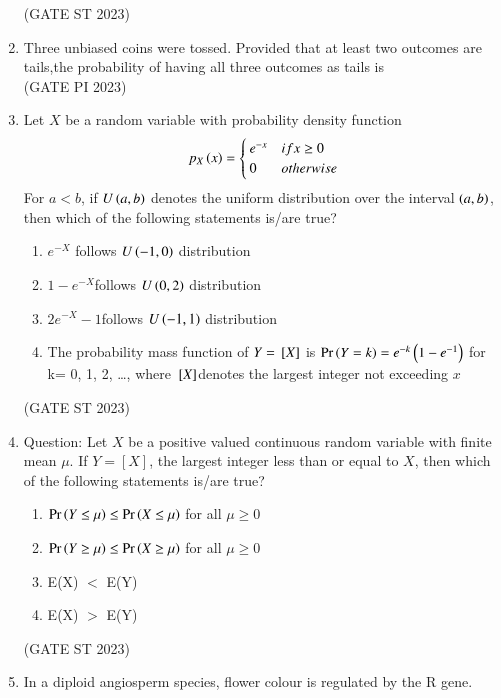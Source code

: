 \begin{enumerate}[label=\thechapter.\arabic*,ref=\thechapter.\theenumi]
\hfill(GATE ST 2023)\\

\item Three unbiased coins were tossed. Provided that at least two outcomes are tails,the probability of having all three outcomes as tails is\\
\hfill(GATE PI 2023)\\

\item Let $X$ be a random variable with probability density function
\begin{align}
p_{X}\left(x\right)=\begin{cases}
		e^{-x} & if x\ge 0\\ 
		0 & otherwise
	\end{cases}
\end{align}
For $a<b$, if $U\left(a,b\right)$ denotes the uniform distribution over the interval $\left(a,b\right)$,
then which of the following statements is/are true?
\begin{enumerate}[label=(\Alph*)]
\item $e^{-X}$ follows $U\left(-1,0\right)$ distribution
\item $1-e^{-X}$follows $U\left(0,2\right)$ distribution
\item $2e^{-X}-1$follows $U\left(-1,1\right)$ distribution
\item The probability mass function of $Y={}\left[X\right]$ is
$\Pr\left(Y=k\right)=e^{-k}\left(1-e^{-1}\right)$ for k= 0, 1, 2, …,
where ${}\left[X\right]$denotes the largest integer not exceeding $x$
\end{enumerate}
\hfill(GATE ST 2023)\\
\solution

\item Question: Let $X$ be a positive valued continuous random variable with finite mean $\mu$.
If $Y=[X]$, the largest integer less than or equal to $X$, then which of the
following statements is/are true?
\begin{enumerate}[label=(\Alph*)]
\item $\Pr\left(Y \leq \mu\right) \leq \Pr\left(X \leq \mu\right)$ for all $\mu \geq 0$
\item $\Pr\left(Y \geq \mu\right) \leq \Pr\left(X \geq \mu\right)$ for all $\mu \geq 0$
\item E(X) $<$ E(Y)
\item E(X) $>$ E(Y)
\end{enumerate}
\hfill(GATE ST 2023)\\

\item In a diploid angiosperm species, flower colour is regulated by the R gene.

\end{enumerate}
